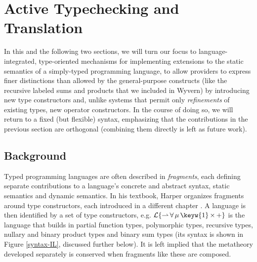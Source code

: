 \newcommand{\rulename}[1]{({\textsc{\textsl{#1}}})}
\newcommand{\keyrule}{{\color{red}~$\star$}}
\newcommand{\minput}{}
\newcommand{\moutput}{^{\color{gray}{+}}}




\section{Active Typechecking and Translation}\label{theory}
In this and the following two sections, we will turn our focus to language-integrated, type-oriented mechanisms for implementing extensions to the static semantics of a simply-typed programming language, to allow providers to express finer distinctions than allowed by the general-purpose constructs (like the recursive labeled sums and products that we included in Wyvern) by introducing new type constructors and, unlike systems that permit only \emph{refinements} of existing types, new operator constructors. In the course of doing so, we will return to a  fixed (but flexible) syntax, emphasizing that the contributions in the previous section are orthogonal (combining them directly is left as future work). %

\subsection{Background}
Typed programming languages are often described in \emph{fragments}, each defining separate contributions to a language's concrete and abstract syntax, static semantics and dynamic semantics. 
In his textbook, Harper organizes fragments around type constructors, each introduced in a different chapter \cite{pfpl}. A language is then identified by a set of type constructors, e.g. $\mathcal{L}\{{\rightharpoonup}\,{\forall}\,{\mu}\,{\keyw{1}}\,{\times}\,{+}\}$ is the language that builds in partial function types,  polymorphic types, recursive types, nullary and binary product types and binary sum types (its syntax is shown in Figure \ref{syntax-IL}, discussed further below).
It is left implied that the metatheory developed separately is conserved when fragments like these are composed.  

